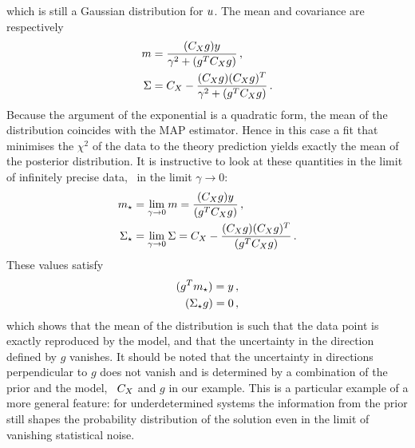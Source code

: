 which is still a Gaussian distribution for $u$. The mean and covariance
are respectively
\begin{align}
  m &= \frac{(C_X g) y}{\gamma^2 + (g^T C_X g)}\, , \\
  \Sigma &= C_X - 
  \frac{(C_X g) (C_X g)^T}{\gamma^2 + (g^T C_X g)}\, .
\end{align}
Because the argument of the exponential is a quadratic form, the mean of the
distribution coincides with the MAP estimator. Hence in this case a fit that
minimises the $\chi^2$ of the data to the theory prediction yields exactly the
mean of the posterior distribution. It is instructive to look at these
quantities in the limit of infinitely precise data, \ie\ in the limit $\gamma\to
0$:
\begin{align}
  m_\star &= 
  \lim_{\gamma\to 0} m
  = \frac{(C_X g) y}{(g^T C_X g)}\, , \\
  \Sigma_\star &= 
  \lim_{\gamma\to 0} \Sigma 
  = C_X - 
  \frac{(C_X g) (C_X g)^T}{(g^T C_X g)}\, .
\end{align}
These values satisfy
\begin{align}
  (g^T m_\star) = y \, , \\
  (\Sigma_\star g) = 0 \, ,
\end{align}
which shows that the mean of the distribution is such that the data point is
exactly reproduced by the model, and that the uncertainty in the direction
defined by $g$ vanishes. It should be noted that the uncertainty in directions
perpendicular to $g$ does not vanish and is determined by a combination of the
prior and the model, \viz\ $C_X$ and $g$ in our example. This is a
particular example of a more general feature: for underdetermined systems the
information from the prior still shapes the probability distribution of the
solution even in the limit of vanishing statistical noise.  

